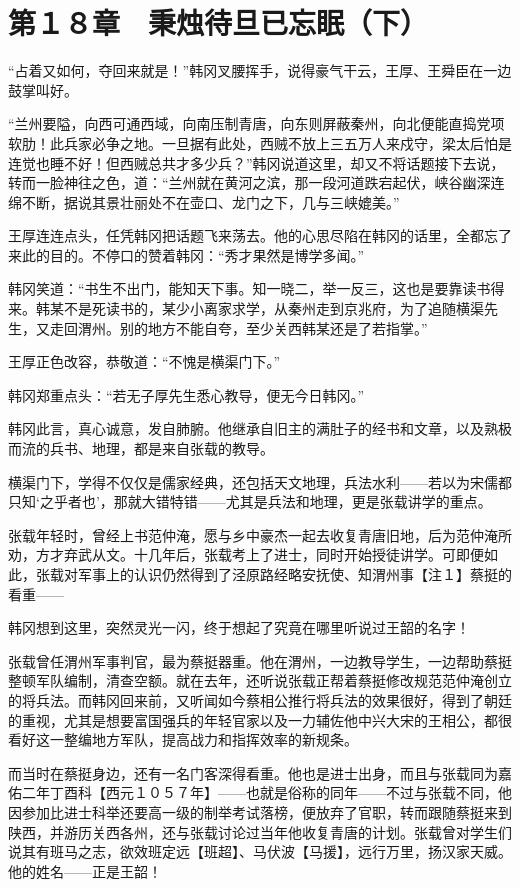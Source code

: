 \section{第１８章　秉烛待旦已忘眠（下）}

“占着又如何，夺回来就是！”韩冈叉腰挥手，说得豪气干云，王厚、王舜臣在一边鼓掌叫好。

“兰州要隘，向西可通西域，向南压制青唐，向东则屏蔽秦州，向北便能直捣党项软肋！此兵家必争之地。一旦据有此处，西贼不放上三五万人来戍守，梁太后怕是连觉也睡不好！但西贼总共才多少兵？”韩冈说道这里，却又不将话题接下去说，转而一脸神往之色，道：“兰州就在黄河之滨，那一段河道跌宕起伏，峡谷幽深连绵不断，据说其景壮丽处不在壶口、龙门之下，几与三峡媲美。”

王厚连连点头，任凭韩冈把话题飞来荡去。他的心思尽陷在韩冈的话里，全都忘了来此的目的。不停口的赞着韩冈：“秀才果然是博学多闻。”

韩冈笑道：“书生不出门，能知天下事。知一晓二，举一反三，这也是要靠读书得来。韩某不是死读书的，某少小离家求学，从秦州走到京兆府，为了追随横渠先生，又走回渭州。别的地方不能自夸，至少关西韩某还是了若指掌。”

王厚正色改容，恭敬道：“不愧是横渠门下。”

韩冈郑重点头：“若无子厚先生悉心教导，便无今日韩冈。”

韩冈此言，真心诚意，发自肺腑。他继承自旧主的满肚子的经书和文章，以及熟极而流的兵书、地理，都是来自张载的教导。

横渠门下，学得不仅仅是儒家经典，还包括天文地理，兵法水利——若以为宋儒都只知‘之乎者也’，那就大错特错——尤其是兵法和地理，更是张载讲学的重点。

张载年轻时，曾经上书范仲淹，愿与乡中豪杰一起去收复青唐旧地，后为范仲淹所劝，方才弃武从文。十几年后，张载考上了进士，同时开始授徒讲学。可即便如此，张载对军事上的认识仍然得到了泾原路经略安抚使、知渭州事【注１】蔡挺的看重——

韩冈想到这里，突然灵光一闪，终于想起了究竟在哪里听说过王韶的名字！

张载曾任渭州军事判官，最为蔡挺器重。他在渭州，一边教导学生，一边帮助蔡挺整顿军队编制，清查空额。就在去年，还听说张载正帮着蔡挺修改规范范仲淹创立的将兵法。而韩冈回来前，又听闻如今蔡相公推行将兵法的效果很好，得到了朝廷的重视，尤其是想要富国强兵的年轻官家以及一力辅佐他中兴大宋的王相公，都很看好这一整编地方军队，提高战力和指挥效率的新规条。

而当时在蔡挺身边，还有一名门客深得看重。他也是进士出身，而且与张载同为嘉佑二年丁酉科【西元１０５７年】——也就是俗称的同年——不过与张载不同，他因参加比进士科举还要高一级的制举考试落榜，便放弃了官职，转而跟随蔡挺来到陕西，并游历关西各州，还与张载讨论过当年他收复青唐的计划。张载曾对学生们说其有班马之志，欲效班定远【班超】、马伏波【马援】，远行万里，扬汉家天威。他的姓名——正是王韶！

